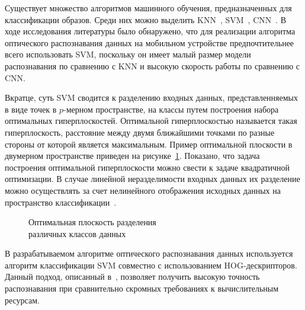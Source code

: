 Существует множество алгоритмов машинного обучения,
предназначенных для классификации образов.
Среди них можно выделить
KNN~\cite{cover67}, SVM~\cite{vapnik74}, CNN~\cite{lecun98}.
В ходе исследования литературы было обнаружено, что
для реализации алгоритма оптического распознавания данных
на мобильном устройстве предпочтительнее всего использовать SVM,
поскольку он имеет малый размер модели распознавания по сравнению с KNN
и высокую скорость работы по сравнению с CNN.

Вкратце, суть SVM сводится к разделению входных данных,
представленняемых в виде точек в \( p \)-мерном пространстве,
на классы путем построения набора оптимальных гиперплоскостей.
Оптимальной гиперплоскостью называется такая гиперплоскость,
расстояние между двумя ближайшими точками по разные стороны от которой
является максимальным.
Пример оптимальной плоскости в двумерном пространстве приведен
на рисунке~\ref{fig:design_algorithm_svm}.
Показано, что задача построения оптимальной гиперплоскости можно свести
к задаче квадратичной оптимизации.
В случае линейной неразделимости входных данных их разделение
можно осуществлять за счет нелинейного отображения исходных данных
на пространство классификации~\cite{boser92}.

\begin{figure}[h!]
  \centering
  \caption{Оптимальная плоскость разделения \\ различных классов данных}
  \label{fig:design_algorithm_svm}
\end{figure}

В разрабатываемом алгоритме оптического распознавания данных
используется алгоритм классификации SVM совместно с
использованием HOG-дескрипторов.
Данный подход, описанный в~\cite{ebrahimzadeh14},
позволяет получить высокую точность распознавания при
сравнительно скромных требованиях к вычислительным ресурсам.

